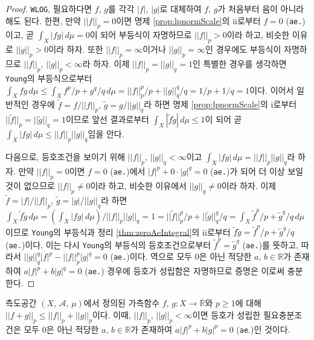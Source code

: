\begin{proof}
    \texttt{WLOG}, 필요하다면 $f,\,g$를 각각 $|f|,\,|g|$로 대체하여 $f,\,g$가 처음부터 음이 아니라 해도 된다. 한편, 만약 $||f||_p=0$이면 명제 \ref{prop:lpnormScale}의 ii로부터 $f=0$ (\texttt{ae.})이고, 곧 $\int_X|fg|\,d\mu=0$이 되어 부등식이 자명하므로 $||f||_p>0$이라 하고, 비슷한 이유로 $||g||_p>0$이라 하자. 또한 $||f||_p=\infty$이거나 $||g||_p=\infty$인 경우에도 부등식이 자명하므로 $||f||_p,\,||g||_p<\infty$라 하자. 이제 $||f||_p=||g||_q=1$인 특별한 경우를 생각하면 \texttt{Young}의 부등식으로부터 $\int_Xfg\,d\mu\leq\int_Xf^p/p+g^q/q\,d\mu=||f||_p^p/p+||g||_q^q/q=1/p+1/q=1$이다. 이어서 일반적인 경우에 $\widetilde{f}=f/||f||_p,\,\widetilde{g}=g/||g||_q$라 하면 명제 \ref{prop:lpnormScale}의 i로부터 $||\widetilde{f}||_p=||\widetilde{g}||_q=1$이므로 앞선 결과로부터 $\int_X|\widetilde{f}\widetilde{g}|\,d\mu\leq1$이 되어 곧 $\int_X|fg|\,d\mu\leq||f||_p||g||_q$임을 안다.

    다음으로, 등호조건을 보이기 위해 $||f||_p,\,||g||_q<\infty$이고 $\int_X|fg|\,d\mu=||f||_p||g||_q$라 하자. 만약 $||f||_p=0$이면 $f=0$ (\texttt{ae.})에서 $|f|^p+0\cdot|g|^q=0$ (\texttt{ae.})가 되어 더 이상 보일 것이 없으므로 $||f||_p\ne0$이라 하고, 비슷한 이유에서 $||g||_q\ne0$이라 하자. 이제 $\widetilde{f}=|f|/||f||_p,\,\widetilde{g}=|g|/||g||_q$라 하면 $\int_X\widetilde{f}\widetilde{g}\,d\mu=(\int_X|fg|\,d\mu)/||f||_p||g||_q=1=||\widetilde{f}||_p^p/p+||\widetilde{g}||_q^q/q=\int_X\widetilde{f}^p/p+\widetilde{g}^q/q\,d\mu$이므로 \texttt{Young}의 부등식과 정리 \ref{thm:zeroAeIntegral}의 ii로부터 $\widetilde{f}\widetilde{g}=\widetilde{f}^p/p+\widetilde{g}^q/q$ (\texttt{ae.})이다. 이는 다시 \texttt{Young}의 부등식의 등호조건으로부터 $\widetilde{f}^p=\widetilde{g}^q$ (\texttt{ae.})를 뜻하고, 따라서 $||g||_q^q|f|^p-||f||_p^p|g|^q=0$ (\texttt{ae.})이다. 역으로 모두 $0$은 아닌 적당한 $a,\,b\in\mathbb{R}$가 존재하여 $a|f|^p+b|g|^q=0$ (\texttt{ae.}) 경우에 등호가 성립함은 자명하므로 증명은 이로써 충분한다.
\end{proof}

\begin{theorem}
    측도공간 $(X,\,\mathcal{A},\,\mu)$에서 정의된 가측함수 $f,\,g:X\to\overline{\mathbb{R}}$와 $p\geq1$에 대해 $||f+g||_p\leq||f||_p+||g||_p$이다. 이때, $||f||_p,\,||g||_p<\infty$이면 등호가 성립한 필요충분조건은 모두 $0$은 아닌 적당한 $a,\,b\in\mathbb{R}$가 존재하여 $a|f|^p+b|g|^p=0$ (\texttt{ae}.)인 것이다.
\end{theorem}

